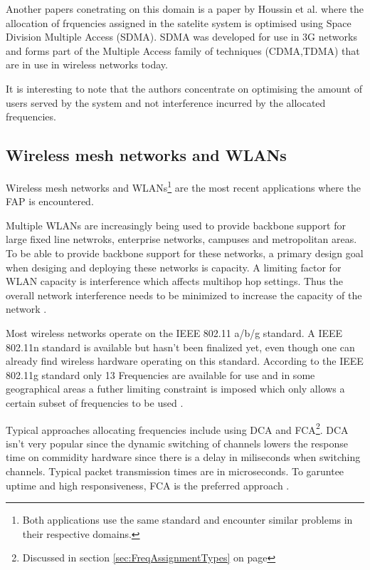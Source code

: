 Another papers conetrating on this domain is a paper by Houssin et al.\cite{SDMASatelite} where the allocation of frquencies assigned in the satelite system is optimised using Space Division Multiple Access (SDMA). SDMA was developed for use in 3G networks and forms part of the Multiple Access family of techniques (CDMA,TDMA) that are in use in wireless networks today. 

It is interesting to note that the authors concentrate on optimising the amount of users served by the system and not interference incurred by the allocated frequencies.

\subsection{Wireless mesh networks and WLANs}
Wireless mesh networks and WLANs\footnote{Both applications use the same standard and encounter similar problems in their respective domains.} are the most recent applications where the FAP is encountered. 

Multiple WLANs are increasingly being used to provide backbone support for large fixed line netwroks, enterprise networks, campuses and metropolitan areas. To be able to provide backbone support for these networks, a primary design goal when desiging and deploying these networks is capacity. A limiting factor for WLAN capacity is interference which affects multihop hop settings. Thus the overall network interference needs to be minimized to increase the capacity of the network \cite{MultiradioMeshNetworks}. 

Most wireless networks operate on the IEEE 802.11 a/b/g standard. A IEEE 802.11n standard is available but hasn't been finalized yet, even though one can already find wireless hardware operating on this standard. According to the IEEE 802.11g standard only 13 Frequencies are available for use and in some geographical areas a futher limiting constraint is imposed which only allows a certain subset of frequencies to be used \cite{Karen2004}.

Typical approaches allocating frequencies include using DCA and FCA\footnote{Discussed in section \ref{sec:FreqAssignmentTypes} on page \pageref{sec:FreqAssignmentTypes}}. DCA isn't very popular since the dynamic switching of channels lowers the response time on commidity hardware since there is a delay in miliseconds when switching channels. Typical packet transmission times are in microseconds. To garuntee uptime and high responsiveness, FCA is the preferred approach \cite{MultiradioMeshNetworks}.

